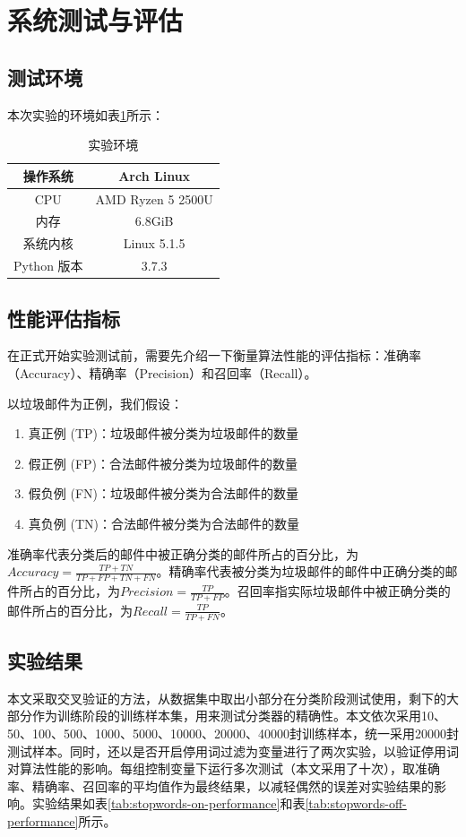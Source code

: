 \documentclass[UTF8,zihao=-4]{ctexart}
\begin{document}
\newpage
\section{系统测试与评估}

\subsection{测试环境}
	本次实验的环境如表\ref{tab:env}所示：
	\begin{table}[!htpb]
		\centering
		\caption{实验环境}
		\label{tab:env}
		\begin{tabular}{|c|c|}
			\hline
			操作系统&Arch Linux\\
			\hline
			CPU&AMD Ryzen 5 2500U\\
			\hline
			内存&6.8GiB\\
			\hline
			系统内核&Linux 5.1.5\\
			\hline
			Python 版本&3.7.3\\
			\hline
		\end{tabular}
	\end{table}

\subsection{性能评估指标}
	在正式开始实验测试前，需要先介绍一下衡量算法性能的评估指标：准确率（Accuracy）、精确率（Precision）和召回率（Recall）。
	
	以垃圾邮件为正例，我们假设：
	
	\begin{enumerate}
		\item 真正例 (TP)：垃圾邮件被分类为垃圾邮件的数量
		\item 假正例 (FP)：合法邮件被分类为垃圾邮件的数量
		\item 假负例 (FN)：垃圾邮件被分类为合法邮件的数量
		\item 真负例 (TN)：合法邮件被分类为合法邮件的数量
	\end{enumerate}

	准确率代表分类后的邮件中被正确分类的邮件所占的百分比，为$Accuracy=\frac{TP+TN}{TP+FP+TN+FN}$。精确率代表被分类为垃圾邮件的邮件中正确分类的邮件所占的百分比，为$Precision=\frac{TP}{TP+FP}$。召回率指实际垃圾邮件中被正确分类的邮件所占的百分比，为$Recall=\frac{TP}{TP+FN}$。

\subsection{实验结果}	
	本文采取交叉验证的方法，从数据集中取出小部分在分类阶段测试使用，剩下的大部分作为训练阶段的训练样本集，用来测试分类器的精确性。本文依次采用10、50、100、500、1000、5000、10000、20000、40000封训练样本，统一采用20000封测试样本。同时，还以是否开启停用词过滤为变量进行了两次实验，以验证停用词对算法性能的影响。每组控制变量下运行多次测试（本文采用了十次），取准确率、精确率、召回率的平均值作为最终结果，以减轻偶然的误差对实验结果的影响。实验结果如表\ref{tab:stopwords-on-performance}和表\ref{tab:stopwords-off-performance}所示。
	
\end{document}
